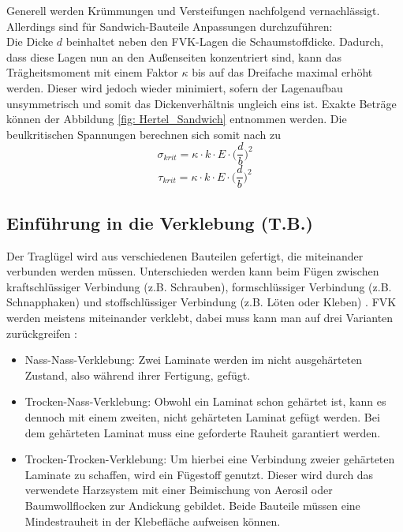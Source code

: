 \noindent Generell werden Krümmungen und Versteifungen nachfolgend vernachlässigt. Allerdings sind für Sandwich-Bauteile Anpassungen durchzuführen:\\
Die Dicke $d$ beinhaltet neben den FVK-Lagen die Schaumstoffdicke. Dadurch, dass diese Lagen nun an den Außenseiten konzentriert sind, kann das Trägheitsmoment mit einem Faktor $\kappa$ bis auf das Dreifache maximal erhöht werden. Dieser wird jedoch wieder minimiert, sofern der Lagenaufbau unsymmetrisch und somit das Dickenverhältnis ungleich eins ist. Exakte Beträge können der Abbildung \ref{fig: Hertel_Sandwich} entnommen werden. Die beulkritischen Spannungen berechnen sich somit nach \cite{item1} zu
\begin{equation}
	\sigma_{krit}=\kappa\cdot k\cdot E\cdot\Big(\frac{d}{b}\Big)^{2}
\end{equation}
\begin{equation}
	\tau_{krit}=\kappa\cdot k\cdot E\cdot\Big(\frac{d}{b}\Big)^{2}
\end{equation}
\newpage

\subsection{Einführung in die Verklebung (T.B.)}\label{Verklebung}
Der Traglügel wird aus verschiedenen Bauteilen gefertigt, die miteinander verbunden werden müssen. Unterschieden werden kann beim Fügen zwischen kraftschlüssiger Verbindung (z.B. Schrauben), formschlüssiger Verbindung (z.B. Schnapphaken) und stoffschlüssiger Verbindung (z.B. Löten oder Kleben) \cite{item23}. FVK werden meistens miteinander verklebt, dabei muss kann man auf drei Varianten zurückgreifen \cite{item4}:
\begin{itemize}
	\item Nass-Nass-Verklebung: Zwei Laminate werden im nicht ausgehärteten Zustand, also während ihrer Fertigung, gefügt.
	\item Trocken-Nass-Verklebung: Obwohl ein Laminat schon gehärtet ist, kann es dennoch mit einem zweiten, nicht gehärteten Laminat gefügt werden. Bei dem gehärteten Laminat muss eine geforderte Rauheit garantiert werden.
	\item Trocken-Trocken-Verklebung: Um hierbei eine Verbindung zweier gehärteten Laminate zu schaffen, wird ein Fügestoff genutzt. Dieser wird durch das verwendete Harzsystem mit einer Beimischung von Aerosil oder Baumwollflocken zur Andickung gebildet. Beide Bauteile müssen eine Mindestrauheit in der Klebefläche aufweisen können.
\end{itemize}

